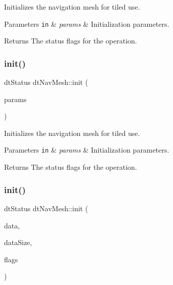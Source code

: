 Initializes the navigation mesh for tiled use. 
\begin{DoxyParams}[1]{Parameters}
\mbox{\tt in}  & {\em params} & Initialization parameters. \\
\hline
\end{DoxyParams}
\begin{DoxyReturn}{Returns}
The status flags for the operation. 
\end{DoxyReturn}
\mbox{\label{classdtNavMesh_a020702938951249972b955a65967234a}} 
\subsubsection{\texorpdfstring{init()}{init()}\hspace{0.1cm}{\footnotesize\ttfamily [2/4]}}
{\footnotesize\ttfamily dt\+Status dt\+Nav\+Mesh\+::init (\begin{DoxyParamCaption}\item[{const \hyperlink{structdtNavMeshParams}{dt\+Nav\+Mesh\+Params} $\ast$}]{params }\end{DoxyParamCaption})}

Initializes the navigation mesh for tiled use. 
\begin{DoxyParams}[1]{Parameters}
\mbox{\tt in}  & {\em params} & Initialization parameters. \\
\hline
\end{DoxyParams}
\begin{DoxyReturn}{Returns}
The status flags for the operation. 
\end{DoxyReturn}
\mbox{\label{classdtNavMesh_a3cbc598755db0d1e9541b15f0f464318}} 
\subsubsection{\texorpdfstring{init()}{init()}\hspace{0.1cm}{\footnotesize\ttfamily [3/4]}}
{\footnotesize\ttfamily dt\+Status dt\+Nav\+Mesh\+::init (\begin{DoxyParamCaption}\item[{unsigned char $\ast$}]{data,  }\item[{const int}]{data\+Size,  }\item[{const int}]{flags }\end{DoxyParamCaption})}

